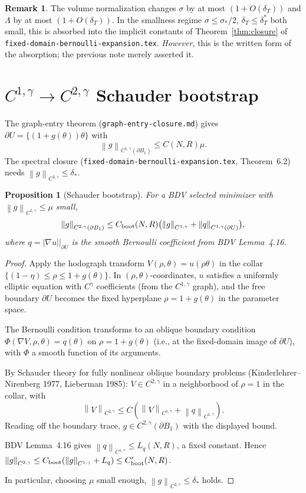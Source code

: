 \documentclass[11pt]{article}
\newtheorem{proposition}[theorem]{Proposition}
\theoremstyle{definition}
\newtheorem{remark}[theorem]{Remark}
\newcommand{\norm}[1]{\left\|#1\right\|}
\newcommand{\abs}[1]{\left|#1\right|}
\begin{document}
\begin{remark}
The volume normalization changes $\sigma$ by at most $(1+O(\delta_T))$ and
$\Lambda$ by at most $(1+O(\delta_T))$. In the smallness regime
$\sigma\le\sigma_*/2$, $\delta_T\le\delta_T^*$ both small, this is absorbed
into the implicit constants of Theorem~\ref{thm:closure} of
\texttt{fixed-domain-bernoulli-expansion.tex}. \emph{However}, this is the
written form of the absorption; the previous note merely asserted it.
\end{remark}

\section{$C^{1,\gamma}\to C^{2,\gamma}$ Schauder bootstrap}\label{sec:bootstrap}

The graph-entry theorem (\texttt{graph-entry-closure.md}) gives
$\partial U=\{(1+g(\theta))\theta\}$ with
\[
\norm{g}_{C^{1,\gamma}(\partial B_1)}\le C(N,R)\mu.
\]
The spectral closure (\texttt{fixed-domain-bernoulli-expansion.tex},
Theorem~6.2) needs $\norm{g}_{C^{2,\gamma}}\le\delta_*$.

\begin{proposition}[Schauder bootstrap]\label{prop:schauder}
For a BDV selected minimizer with $\norm{g}_{C^{1,\gamma}}\le\mu$ small,
\[
\norm{g}_{C^{2,\gamma}(\partial B_1)}
\le C_{\rm boot}(N,R)\bigl(\norm{g}_{C^{1,\gamma}}+\norm{q}_{C^{1,\gamma}(\partial U)}\bigr),
\]
where $q=\abs{\nabla u}\big|_{\partial U}$ is the smooth Bernoulli coefficient
from BDV Lemma~4.16.
\end{proposition}

\begin{proof}
Apply the hodograph transform $V(\rho,\theta)=u(\rho\theta)$ in the collar
$\{(1-\eta)\le\rho\le1+g(\theta)\}$. In $(\rho,\theta)$-coordinates, $u$
satisfies a uniformly elliptic equation with $C^\gamma$ coefficients (from
the $C^{1,\gamma}$ graph), and the free boundary $\partial U$ becomes the
fixed hyperplane $\rho=1+g(\theta)$ in the parameter space.

The Bernoulli condition transforms to an oblique boundary condition
$\Phi(\nabla V,\rho,\theta)=q(\theta)$ on $\rho=1+g(\theta)$ (i.e., at the
fixed-domain image of $\partial U$), with $\Phi$ a smooth function of its
arguments.

By Schauder theory for fully nonlinear oblique boundary problems
(Kinderlehrer--Nirenberg 1977, Lieberman 1985):
$V\in C^{2,\gamma}$ in a neighborhood of $\rho=1$ in the collar, with
\[
\norm{V}_{C^{2,\gamma}}\le C(\norm{V}_{C^{1,\gamma}}+\norm{q}_{C^{1,\gamma}}).
\]
Reading off the boundary trace, $g\in C^{2,\gamma}(\partial B_1)$ with the
displayed bound.

BDV Lemma~4.16 gives $\norm{q}_{C^{1,\gamma}}\le L_q(N,R)$, a fixed
constant. Hence
$\norm{g}_{C^{2,\gamma}}\le C_{\rm boot}(\norm{g}_{C^{1,\gamma}}+L_q)\le C_{\rm boot}'(N,R)$.

In particular, choosing $\mu$ small enough,
$\norm{g}_{C^{2,\gamma}}\le\delta_*$ holds.
\end{proof}
\end{document}
